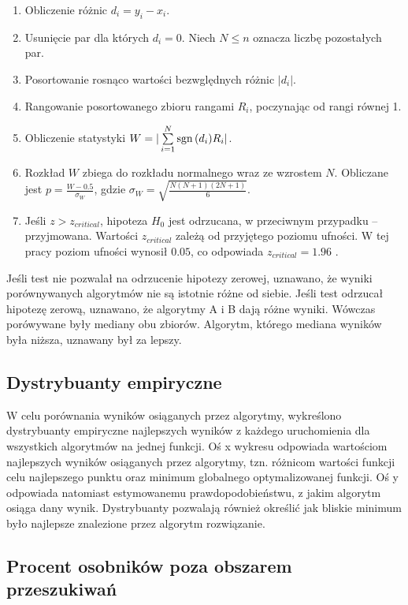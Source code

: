 \documentclass[a4paper,onecolumn,oneside,12pt,wide,floatssmall]{mwrep}
\def\sgn{{\rm sgn}\,}
\theoremstyle{definition}
\theoremstyle{plain}%
\theoremstyle{remark}
\begin{document}
\begin{enumerate}
 \item Obliczenie różnic $d_i = y_i - x_i$.
 \item Usunięcie par dla których $d_i = 0$. Niech $N \leq n$ oznacza liczbę pozostałych par.
 \item Posortowanie rosnąco wartości bezwględnych różnic $|d_i|$.
 \item Rangowanie posortowanego zbioru rangami $R_i$, poczynając od rangi równej 1. 
 \item Obliczenie statystyki $W = |\sum\limits_{i=1}^{N} \sgn(d_i)R_i|$.
 \item Rozkład $W$ zbiega do rozkładu normalnego wraz ze wzrostem $N$. Obliczane jest
 $p = \frac{W - 0.5}{\sigma_W}$, gdzie $\sigma_W = \sqrt{\frac{N(N+1)(2N+1)}{6}}.$ 
 \item Jeśli $z > z_{critical}$, hipoteza $H_0$ jest odrzucana, w przeciwnym przypadku -- przyjmowana. 
Wartości $z_{critical}$ zależą od przyjętego poziomu ufności. 
W tej pracy poziom ufności wynosił $0.05$, co odpowiada $z_{critical}=1.96$ \cite{lowry}.  
\end{enumerate}

Jeśli test nie pozwalał na odrzucenie hipotezy zerowej, uznawano, że wyniki porównywanych algorytmów
nie są istotnie różne od siebie. 
Jeśli test odrzucał hipotezę zerową, uznawano, że algorytmy A i B dają różne wyniki.
Wówczas porówywane były mediany obu zbiorów. Algorytm, którego mediana wyników była niższa,
uznawany był za lepszy.

\subsection{Dystrybuanty empiryczne}

W celu porównania wyników osiąganych przez algorytmy, 
wykreślono dystrybuanty empiryczne najlepszych wyników z każdego uruchomienia 
dla wszystkich algorytmów na jednej funkcji. Oś x wykresu
odpowiada wartościom najlepszych wyników osiąganych przez algorytmy, tzn. różnicom wartości funkcji celu najlepszego
punktu oraz minimum globalnego optymalizowanej funkcji. Oś y odpowiada natomiast 
estymowanemu prawdopodobieństwu, z jakim algorytm osiąga dany wynik. Dystrybuanty pozwalają również
określić jak bliskie minimum było najlepsze znalezione przez algorytm rozwiązanie.

\subsection{Procent osobników poza obszarem przeszukiwań}
\end{document}
